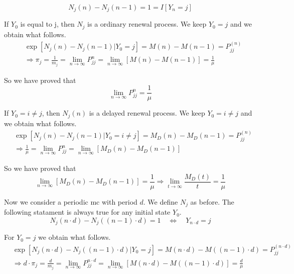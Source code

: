 	\begin{equation}
		N_j(n)-N_j(n-1)=1 = I[Y_n=j]
	\end{equation}

	If $Y_0$ is equal to j, then $N_j$ is a ordinary renewal process. We keep $Y_0=j$ and we obtain what follows.
	\begin{align*}
		& \exp[N_j(n)-N_j(n-1)|Y_0=j]=M(n)-M(n-1)=P_{jj}^{(n)}
		\\ & \Rightarrow \pi_j=\frac{1}{m_j}=\lim_{n \to \infty} P_{jj}^{n} = \lim_{n \to \infty} [M(n)-M(n-1)]=\frac{1}{\mu}
	\end{align*}

	So we have proved that
	\begin{equation}
		\lim_{n \to \infty} P_{jj}^{n}=\frac{1}{\mu}
	\end{equation}

	If $Y_0=i \neq j$, then $N_j(n)$ is a delayed renewal process. We keep $Y_0=i \neq j$ and we obtain what follows.
	\begin{align*}
		& \exp[N_j(n)-N_j(n-1)|Y_0=i \neq j]=M_D(n)-M_D(n-1)=P_{jj}^{(n)}
		\\ & \Rightarrow \frac{1}{\mu}=\lim_{n \to \infty} P_{jj}^{n} = \lim_{n \to \infty} [M_D(n)-M_D(n-1)]
	\end{align*}

	So we have proved that
	\begin{equation}
		\lim_{n \to \infty} [M_D(n)-M_D(n-1)]=\frac{1}{\mu} \Rightarrow \lim_{t \to \infty }\frac{M_D(t)}{t}=\frac{1}{\mu}
	\end{equation}

	Now we consider a periodic \gls{mc} with period $d$. We define $N_j$ as before. The following statament is always true for any initial state $Y_0$.
	\begin{equation}
		N_j(n \cdot d)-N_j((n-1)\cdot d)=1 \quad \Leftrightarrow \quad Y_{n \cdot d}=j
	\end{equation}

	For $Y_0=j$ we obtain what follows.
	\begin{align*}
		& \exp[N_j(n \cdot d)-N_j((n-1)\cdot d)|Y_0=j]=M(n \cdot d)-M((n-1)\cdot d)=P_{jj}^{(n \cdot d)}
		\\ & \Rightarrow d \cdot \pi_j=\frac{d}{m_j}=\lim_{n \to \infty} P_{jj}^{n \cdot d} = \lim_{n \to \infty} [ M(n \cdot d)- M( (n-1) \cdot d)]=\frac{d}{\mu}
	\end{align*}


